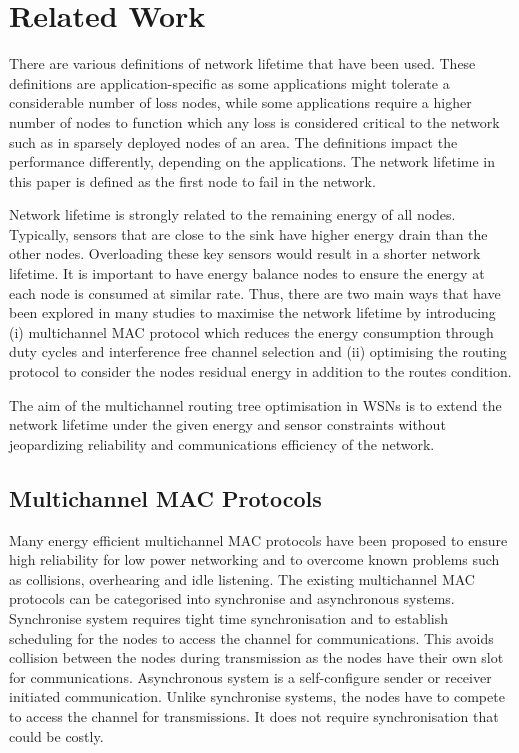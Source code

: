\section{Related Work}
\label{RelatedWork}

There are various definitions of network lifetime that have been used. These definitions are application-specific as some applications might tolerate a considerable number of loss nodes, while some applications require a higher number of nodes to function which any loss is considered critical to the network such as in sparsely deployed nodes of an area. The definitions impact the performance differently, depending on the applications. The network lifetime in this paper is defined as the first node to fail in the network.

Network lifetime is strongly related to the remaining energy of all nodes. Typically, sensors that are close to the sink have higher energy drain than the other nodes. Overloading these key sensors would result in a shorter network lifetime.
It is important to have energy balance nodes to ensure the energy at each node is consumed at similar rate.
Thus, there are two main ways that have been explored in many studies to maximise the network lifetime by introducing (i) multichannel MAC protocol which reduces the energy consumption through duty cycles and interference free channel selection and (ii) optimising the routing protocol to consider the nodes residual energy in addition to the routes condition.

The aim of the multichannel routing tree optimisation in WSNs is to extend the network lifetime under the given energy and sensor constraints without jeopardizing reliability and communications efficiency of the network.

\subsection{Multichannel MAC Protocols}
Many energy efficient multichannel MAC protocols have been proposed to ensure high reliability for low power networking and to overcome known problems such as collisions, overhearing and idle listening.
The existing multichannel MAC protocols can be categorised into synchronise and asynchronous systems. Synchronise system requires tight time synchronisation and to establish scheduling for the nodes to access the channel for communications. This avoids collision between the nodes during transmission as the nodes have their own slot for communications. Asynchronous system is a self-configure sender or receiver initiated communication. Unlike synchronise systems, the nodes have to compete to access the channel for transmissions. It does not require synchronisation that could be costly.

